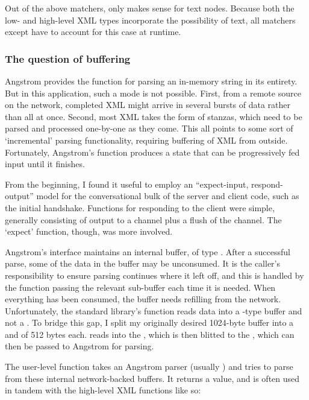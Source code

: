 \documentclass[12pt,a4paper,twoside,openright]{report}
\begin{document}
{Out of the above matchers, only  makes sense for text nodes. Because both the low- and high-level XML types incorporate the possibility of text, all matchers except  have to account for this case at runtime.

\subsubsection{The question of buffering}
Angstrom provides the  function for parsing an in-memory string in its entirety. But in this application, such a mode is not possible. First, from a remote source on the network, completed XML might arrive in several bursts of data rather than all at once. Second, most XML takes the form of stanzas, which need to be parsed and processed one-by-one as they come. This all points to some sort of `incremental' parsing functionality, requiring buffering of XML from outside. Fortunately, Angstrom's  function produces a state that can be progressively fed input until it finishes.

From the beginning, I found it useful to employ an ``expect-input, respond-output'' model for the conversational bulk of the server and client code, such as the initial handshake. Functions for responding to the client were simple, generally consisting of output to a channel plus a flush of the channel. The `expect' function, though, was more involved.

Angstrom's  interface maintains an internal buffer, of type . After a successful parse, some of the data in the buffer may be unconsumed. It is the caller's responsibility to ensure parsing continues where it left off, and this is handled by the function passing the relevant sub-buffer each time it is needed. When everything has been consumed, the buffer needs refilling from the network. Unfortunately, the standard library's  function reads data into a -type buffer and not a . To bridge this gap, I split my originally desired 1024-byte buffer into a  and  of 512 bytes each.  reads into the , which is then blitted to the , which can then be passed to Angstrom for parsing.

The user-level  function takes an Angstrom parser (usually ) and tries to parse from these internal network-backed buffers. It returns a  value, and is often used in tandem with the high-level XML functions like so:

}
\end{document}
